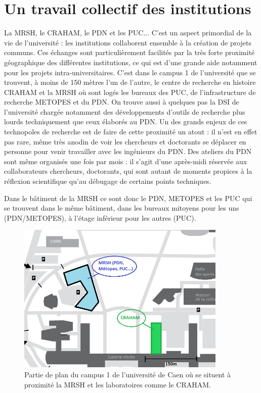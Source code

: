 \documentclass[a4paper,12pt,twoside]{book}
\begin{document}
\chapter{Un travail collectif des institutions}
    La \acrshort{MRSH}, le \acrshort{CRAHAM}, le \acrshort{PDN} et les \acrshort{PUC}... C'est un aspect primordial de la vie de l'université : les institutions collaborent ensemble à la création de projets communs. Ces échanges sont particulièrement facilités par la très forte proximité géographique des différentes institutions, ce qui est d'une grande aide notamment pour les projets intra-universitaires. C'est dans le campus 1 de l'université que se trouvent, à moins de 150 mètres l'un de l'autre, le centre de recherche en histoire \acrshort{CRAHAM} et la \acrshort{MRSH} où sont logés les bureaux des \acrfull{PUC}, de l'infrastructure de recherche \acrshort{METOPES} et du \acrlong{PDN}. On trouve aussi à quelques pas la \acrfull{DSI} de l'université chargée notamment des développements d'outils de recherche plus lourds techniquement que ceux élaborés au \acrshort{PDN}. Un des grands enjeux de ces \og technopoles \fg{} de recherche est de faire de cette proximité un atout : il n'est en effet pas rare, même très anodin de voir les chercheurs et doctorants se déplacer en personne pour venir travailler avec les ingénieurs du \acrshort{PDN}. Des \og ateliers du \acrshort{PDN}\fg{} sont même organisés une fois par mois : il s'agit d'une après-midi réservée aux collaborateurs chercheurs, doctorants, qui sont autant de moments propices à la réflexion scientifique qu'au débugage de certains points techniques. 
    
    Dans le bâtiment de la \acrshort{MRSH} ce sont donc le \acrshort{PDN}, \acrshort{METOPES} et les \acrshort{PUC} qui se trouvent dans le même bâtiment, dans les bureaux mitoyens pour les uns (\acrshort{PDN}/METOPES), à l'étage inférieur pour les autres (\acrshort{PUC}).
    
    \begin{figure}[H]
        \centering
        \includegraphics[width=10cm]{img/partie_1/campus-univ-zoom.png}
        \caption{Partie de plan du campus 1 de l'université de Caen où se situent à proximité la \acrshort{MRSH} et les laboratoires comme le CRAHAM.}
    \end{figure}
   
\end{document}

